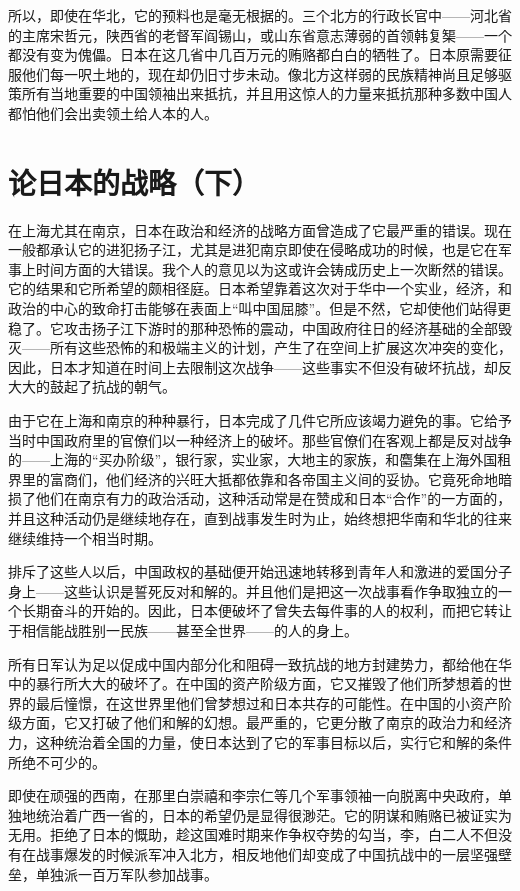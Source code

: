 \documentclass[10pt]{book}
\begin{document}
所以，即使在华北，它的预料也是毫无根据的。三个北方的行政长官中——河北省的主席宋哲元，陕西省的老督军阎锡山，或山东省意志薄弱的首领韩复榘——一个都没有变为傀儡。日本在这几省中几百万元的贿赂都白白的牺牲了。日本原需要征服他们每一呎土地的，现在却仍旧寸步未动。像北方这样弱的民族精神尚且足够驱策所有当地重要的中国领袖出来抵抗，并且用这惊人的力量来抵抗那种多数中国人都怕他们会出卖领土给人本的人。

\section{论日本的战略（下）}

在上海尤其在南京，日本在政治和经济的战略方面曾造成了它最严重的错误。现在一般都承认它的进犯扬子江，尤其是进犯南京即使在侵略成功的时候，也是它在军事上时间方面的大错误。我个人的意见以为这或许会铸成历史上一次断然的错误。它的结果和它所希望的颇相径庭。日本希望靠着这次对于华中一个实业，经济，和政治的中心的致命打击能够在表面上“叫中国屈膝”。但是不然，它却使他们站得更稳了。它攻击扬子江下游时的那种恐怖的震动，中国政府往日的经济基础的全部毁灭——所有这些恐怖的和极端主义的计划，产生了在空间上扩展这次冲突的变化，因此，日本才知道在时间上去限制这次战争——这些事实不但没有破坏抗战，却反大大的鼓起了抗战的朝气。

由于它在上海和南京的种种暴行，日本完成了几件它所应该竭力避免的事。它给予当时中国政府里的官僚们以一种经济上的破坏。那些官僚们在客观上都是反对战争的——上海的“买办阶级”，银行家，实业家，大地主的家族，和麕集在上海外国租界里的富商们，他们经济的兴旺大抵都依靠和各帝国主义间的妥协。它竟死命地暗损了他们在南京有力的政治活动，这种活动常是在赞成和日本“合作”的一方面的，并且这种活动仍是继续地存在，直到战事发生时为止，始终想把华南和华北的往来继续维持一个相当时期。

排斥了这些人以后，中国政权的基础便开始迅速地转移到青年人和激进的爱国分子身上——这些认识是誓死反对和解的。并且他们是把这一次战事看作争取独立的一个长期奋斗的开始的。因此，日本便破坏了曾失去每件事的人的权利，而把它转让于相信能战胜别一民族——甚至全世界——的人的身上。

所有日军认为足以促成中国内部分化和阻碍一致抗战的地方封建势力，都给他在华中的暴行所大大的破坏了。在中国的资产阶级方面，它又摧毁了他们所梦想着的世界的最后憧憬，在这世界里他们曾梦想过和日本共存的可能性。在中国的小资产阶级方面，它又打破了他们和解的幻想。最严重的，它更分散了南京的政治力和经济力，这种统治着全国的力量，使日本达到了它的军事目标以后，实行它和解的条件所绝不可少的。

即使在顽强的西南，在那里白崇禧和李宗仁等几个军事领袖一向脱离中央政府，单独地统治着广西一省的，日本的希望仍是显得很渺茫。它的阴谋和贿赂已被证实为无用。拒绝了日本的慨助，趁这国难时期来作争权夺势的勾当，李，白二人不但没有在战事爆发的时候派军冲入北方，相反地他们却变成了中国抗战中的一层坚强壁垒，单独派一百万军队参加战事。
\end{document}

